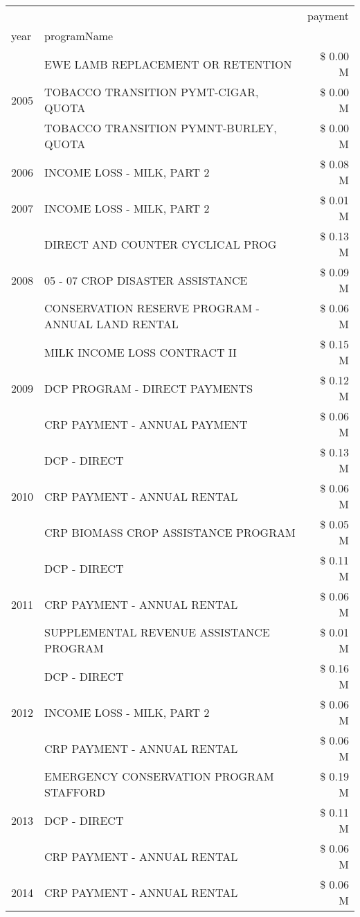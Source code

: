 \begin{tabular}{llr}
\toprule
 &  & payment \\
year & programName &  \\
\midrule
\multirow[t]{3}{*}{2005} & EWE LAMB REPLACEMENT OR RETENTION & \$ 0.00 M \\
 & TOBACCO TRANSITION PYMT-CIGAR, QUOTA & \$ 0.00 M \\
 & TOBACCO TRANSITION PYMNT-BURLEY, QUOTA & \$ 0.00 M \\
\cline{1-3}
2006 & INCOME LOSS - MILK, PART 2 & \$ 0.08 M \\
\cline{1-3}
2007 & INCOME LOSS - MILK, PART 2 & \$ 0.01 M \\
\cline{1-3}
\multirow[t]{3}{*}{2008} & DIRECT AND COUNTER CYCLICAL PROG & \$ 0.13 M \\
 & 05 - 07 CROP DISASTER ASSISTANCE & \$ 0.09 M \\
 & CONSERVATION RESERVE PROGRAM - ANNUAL LAND RENTAL & \$ 0.06 M \\
\cline{1-3}
\multirow[t]{3}{*}{2009} & MILK INCOME LOSS CONTRACT II & \$ 0.15 M \\
 & DCP PROGRAM - DIRECT PAYMENTS & \$ 0.12 M \\
 & CRP PAYMENT - ANNUAL PAYMENT & \$ 0.06 M \\
\cline{1-3}
\multirow[t]{3}{*}{2010} & DCP - DIRECT & \$ 0.13 M \\
 & CRP PAYMENT - ANNUAL RENTAL & \$ 0.06 M \\
 & CRP BIOMASS CROP ASSISTANCE PROGRAM & \$ 0.05 M \\
\cline{1-3}
\multirow[t]{3}{*}{2011} & DCP - DIRECT & \$ 0.11 M \\
 & CRP PAYMENT - ANNUAL RENTAL & \$ 0.06 M \\
 & SUPPLEMENTAL REVENUE ASSISTANCE PROGRAM & \$ 0.01 M \\
\cline{1-3}
\multirow[t]{3}{*}{2012} & DCP - DIRECT & \$ 0.16 M \\
 & INCOME LOSS - MILK, PART 2 & \$ 0.06 M \\
 & CRP PAYMENT - ANNUAL RENTAL & \$ 0.06 M \\
\cline{1-3}
\multirow[t]{3}{*}{2013} & EMERGENCY CONSERVATION PROGRAM STAFFORD & \$ 0.19 M \\
 & DCP - DIRECT & \$ 0.11 M \\
 & CRP PAYMENT - ANNUAL RENTAL & \$ 0.06 M \\
\cline{1-3}
\multirow[t]{3}{*}{2014} & CRP PAYMENT - ANNUAL RENTAL & \$ 0.06 M \\

\end{tabular}
